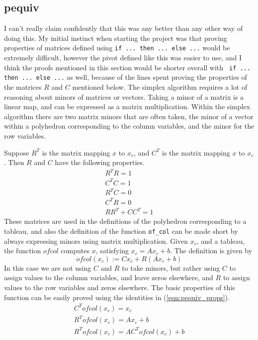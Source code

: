 \documentclass[11pt]{article} %
\begin{document}
\subsection{pequiv}
\color{red} I can't really claim confidently that this was any better than any other way of doing this. My initial instinct when starting the project was that proving properties of matrices defined using \lstinline|if ... then ... else ...| would be extremely difficult, however the pivot defined like this was easier to use, and I think the proofs mentioned in this section would be shorter overall with \lstinline| if ... then ... else ...| as well, because of the lines spent proving the properties of the matrices $R$ and $C$ mentioned below. \color{black}
The simplex algorithm requires a lot of reasoning about minors of matrices or vectors. Taking a minor of a matrix is a linear map, and can be expressed as a matrix multiplication. Within the simplex algorithm there are two matrix minors that are often taken, the minor of a vector within a polyhedron corresponding to the column variables, and the minor for the row variables.

Suppose $R^T$ is the matrix mapping $x$ to $x_r$, and $C^T$ is the matrix mapping $x$ to $x_c$. Then $R$ and $C$ have the following properties.
\begin{equation}\label{eqn:pequiv_props}
  \begin{aligned}
    R^TR = 1 \\
    C^TC = 1 \\
    R^TC = 0 \\
    C^TR = 0 \\
    RR^T + CC^T = 1
  \end{aligned}
\end{equation}
These matrices are used in the definitions of the polyhedron corresponding to a tableau, and also the definition of the function \lstinline|of_col| can be made short by always expressing minors using matrix multiplication. Given $x_c$, and a tableau, the function $ofcol$ computes $x$, satisfying $x_r = Ax_c + b$. The definition is given by
\begin{equation}
  ofcol(x_c) := Cx_c + R(Ax_c+b)
\end{equation}
In this case we are not using $C$ and $R$ to take minors, but rather using $C$ to assign values to the column variables, and leave zeros elsewhere, and $R$ to assign values to the row variables and zeros elsewhere. The basic properties of this function can be easily proved using the identities in (\ref{eqn:pequiv_props}).
\begin{equation}
  \begin{aligned}
    C^Tofcol(x_c) = x_c \\
    R^Tofcol(x_c) = Ax_c + b \\
    R^Tofcol(x_c) = AC^Tofcol(x_c) + b
  \end{aligned}
\end{equation}
\end{document}
